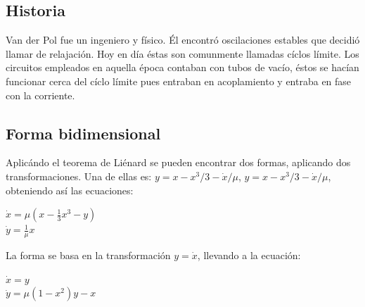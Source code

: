 \documentclass{article}
\begin{document}
\subsection{Historia}
Van der Pol fue un ingeniero y físico. Él encontró oscilaciones estables que decidió llamar de relajación. Hoy en día éstas son comunmente llamadas cíclos límite. Los circuitos empleados en aquella época contaban con tubos de vacío, éstos se hacían funcionar cerca del cíclo límite pues entraban en acoplamiento y entraba en fase con la corriente.\\
\subsection{Forma bidimensional}
Aplicándo el teorema de Liénard se pueden encontrar dos formas, aplicando dos transformaciones. Una de ellas es: $y=x-x^{3}/3-\dot{x}/\mu$, $y=x-x^{3}/3-\dot{x}/\mu$, obteniendo así las ecuaciones:\\
\begin{center}
$\dot{x}=\mu(x-\frac{1}{3}x^{3}-y)$\\
$\dot{y}=\frac{1}{\mu}x$\\
\end{center}
La forma se basa en la transformación $y=\dot{x}$, llevando a la ecuación:\\
\begin{center}
$\dot{x}=y$\\
$\dot{y}=\mu(1-x^{2})y-x$\\
\end{center}
\end{document}
